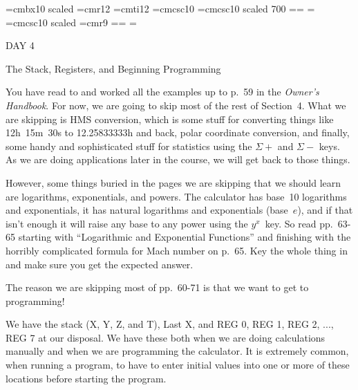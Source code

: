 
\def\folio{\ifnum\pageno>0 \number\pageno \else
   \ifnum\pageno<0 \romannumeral-\pageno \else\fi\fi}

\font\largebf=cmbx10  scaled 
\font\largerm=cmr12
\font\largeit=cmti12
\font\tensc=cmcsc10
\font\sevensc=cmcsc10 scaled 700
\newfam\scfam \def\sc{\fam\scfam\tensc}
\textfont\scfam=\tensc \scriptfont\scfam=\sevensc
\scriptscriptfont\scfam=\sevensc
\font\largesc=cmcsc10 scaled 
\font\ninerm=cmr9
\newfam\srfam \def\sr{\fam\srfam\ninerm}
\textfont\srfam=\ninerm \scriptfont\srfam=\sevenrm
\scriptscriptfont\srfam=\fiverm




\null\vskip36pt

\centerline{\largerm DAY 4}
\nobreak\bigskip

\centerline{\largeit The Stack, Registers, and Beginning Programming}
\nobreak\bigskip

\nobreak\bigskip

\noindent You have read to and worked all the examples up to p.~59 in the {\it Owner's Handbook}. For now, we are going to skip most of the rest of Section~4. What we are skipping is HMS conversion, which is some stuff for converting things like 12h~15m~30s to 12.25833333h and back, polar coordinate conversion, and finally, some handy and sophisticated stuff for statistics using the $\Sigma+$ and $\Sigma-$ keys. As we are doing applications later in the course, we will get back to those things.

However, some things buried in the pages we are skipping that we should learn are logarithms, exponentials, and powers. The calculator has base~10 logarithms and exponentials, it has natural logarithms and exponentials (base~$e$), and if that isn't enough it will raise any base to any power using the $y^x$~key. So read pp.~63-65 starting with ``Logarithmic and Exponential Functions'' and finishing with the horribly complicated formula for Mach number on p.~65. Key the whole thing in and make sure you get the expected answer.

The reason we are skipping most of pp.~60-71 is that we want to get to programming!

\bigskip

\nobreak\bigskip

\noindent We have the stack  (X, Y, Z, and T), Last X, and REG 0, REG 1, REG 2, ..., REG 7 at our disposal. We have these both when we are doing calculations manually and when we are programming the calculator. It is extremely common, when running a program, to have to enter initial values into one or more of these locations before starting the program.


